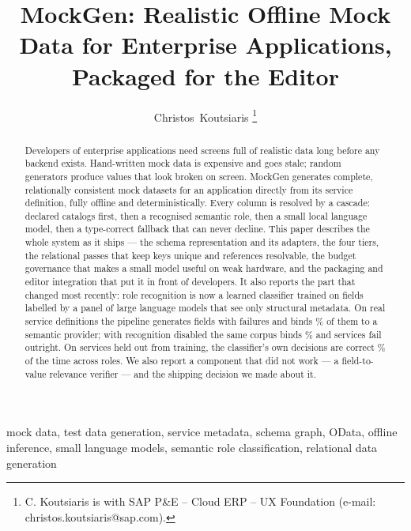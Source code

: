 \documentclass[journal]{IEEEtran}
\newcommand{\system}{MockGen}
\begin{document}
\title{\system: Realistic Offline Mock Data for Enterprise
Applications, Packaged for the Editor}

\author{Christos~Koutsiaris%
\thanks{C. Koutsiaris is with SAP P\&E -- Cloud ERP -- UX Foundation
(e-mail: christos.koutsiaris@sap.com).}}

\markboth{Preprint}{Koutsiaris: \system}

\maketitle

\begin{abstract}
Developers of enterprise applications need screens full of realistic
data long before any backend exists. Hand-written mock data is expensive
and goes stale; random generators produce values that look broken on
screen. \system{} generates complete, relationally consistent mock
datasets for an application directly from its service definition, fully
offline and deterministically. Every column is resolved by a cascade:
declared catalogs first, then a recognised semantic role, then a small
local language model, then a type-correct fallback that can never
decline. This paper describes the whole system as it ships --- the
schema representation and its adapters, the four tiers, the relational
passes that keep keys unique and references resolvable, the budget
governance that makes a small model useful on weak hardware, and the
packaging and editor integration that put it in front of developers. It
also reports the part that changed most recently: role recognition is
now a learned classifier trained on \LabelFields{} fields labelled by a
panel of \LabelJudges{} large language models that see only structural
metadata. On \CorpusServices{} real service definitions the pipeline
generates \CorpusFields{} fields with \CorpusFailed{} failures and binds
\ProviderBoundPct\% of them to a semantic provider; with recognition
disabled the same corpus binds \DetProviderBoundPct\% and
\DetFailed{} services fail outright. On \SealedServices{} services held
out from training, the classifier's own decisions are correct
\SealedPrecision\% of the time across \RoutableRoles{} roles. We also
report a component that did not work --- a field-to-value relevance
verifier --- and the shipping decision we made about it.
\end{abstract}

\begin{IEEEkeywords}
mock data, test data generation, service metadata, schema graph, OData,
offline inference, small language models, semantic role classification,
relational data generation
\end{IEEEkeywords}
\end{document}
